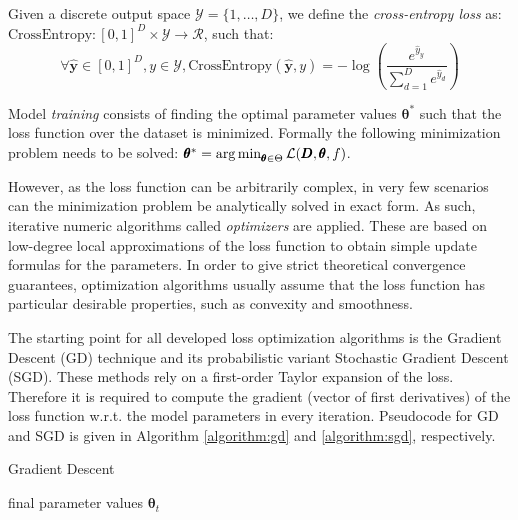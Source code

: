 \begin{definition}
Given a discrete output space $\mathcal{Y}=\{1,\dots,D\}$, we define the \emph{cross-entropy loss} as: $\text{CrossEntropy}: [0, 1]^D \times \mathcal{Y} \to \mathcal{R}$, such that:
\begin{equation}
\forall \hat{\pmb{y}} \in [0, 1]^D, y \in \mathcal{Y}, \text{CrossEntropy}(\hat{\pmb{y}},y)= - \log{\left(\frac{e^{\hat{y}_y}}{\sum_{d=1}^{D}{e^{\hat{y}_d}}}\right)}\end{equation}
\end{definition}

\begin{definition}
Model \emph{training} consists of finding the optimal parameter values $\pmb{\theta}^*$ such that the loss function over the dataset is minimized. Formally the following minimization problem needs to be solved: $\pmb{\theta}^* = \operatorname*{arg\,min}_{\pmb{\theta} \in \Theta}{\mathcal{L}(\pmb{D}, \pmb{\theta}, f)}$.
\end{definition}

However, as the loss function can be arbitrarily complex, in very few scenarios can the minimization problem be analytically solved in exact form. As such, iterative numeric algorithms called \emph{optimizers} are applied. These are based on low-degree local approximations of the loss function to obtain simple update formulas for the parameters. In order to give strict theoretical convergence guarantees, optimization algorithms usually assume that the loss function has particular desirable properties, such as convexity and smoothness.

The starting point for all developed loss optimization algorithms is the Gradient Descent (GD) technique and its probabilistic variant Stochastic Gradient Descent (SGD). These methods rely on a first-order Taylor expansion of the loss. Therefore it is required to compute the gradient (vector of first derivatives) of the loss function w.r.t. the model parameters in every iteration. Pseudocode for GD and SGD is given in Algorithm \ref{algorithm:gd} and \ref{algorithm:sgd}, respectively.

\begin{algorithm}
\caption{Gradient Descent}
\label{algorithm:gd}
\begin{algorithmic}
\ENDWHILE
\RETURN final parameter values $\pmb{\theta}_{t}$
\end{algorithmic}
\end{algorithm} 

